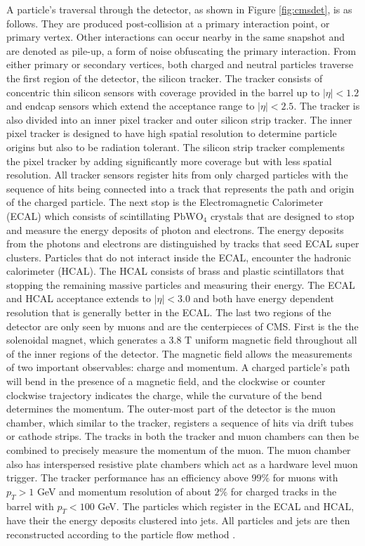 A particle's traversal through the detector, as shown in Figure \ref{fig:cmsdet}, is as follows. They are produced post-collision at a primary interaction point, or primary vertex. Other interactions can occur nearby in the same snapshot and are denoted as pile-up, a form of noise obfuscating the primary interaction. From either primary or secondary vertices, both charged and neutral particles traverse the first region of the detector, the silicon tracker. The tracker consists of concentric thin silicon sensors with coverage provided in the barrel up to $|\eta|<1.2$ and endcap sensors which extend the acceptance range to $|\eta| < 2.5$. The tracker is also divided into an inner pixel tracker and outer silicon strip tracker. The inner pixel tracker is designed to have high spatial resolution to determine particle origins but also to be radiation tolerant. The silicon strip tracker complements the pixel tracker by adding significantly more coverage but with less spatial resolution. All tracker sensors  register hits from only charged particles with the sequence of hits being connected into a track that represents the path and origin of the charged particle.  The next stop is the Electromagnetic Calorimeter (ECAL) which consists of scintillating $\text{PbWO}_4$ crystals that are designed to stop and measure the energy deposits of photon and electrons. The energy deposits from the photons and electrons are distinguished by tracks that seed ECAL super clusters. Particles that do not interact inside the ECAL, encounter the hadronic calorimeter (HCAL). The HCAL consists of brass and plastic scintillators that stopping the remaining massive particles and measuring their energy. The ECAL and HCAL acceptance extends to $|\eta| <3.0$ and both have energy dependent resolution that is generally better in the ECAL. The last two regions of the detector are only seen by muons and are the centerpieces of CMS. First is the the solenoidal magnet, which generates a 3.8 T uniform magnetic field throughout all of the inner regions of the detector. The magnetic field allows the measurements of two important observables: charge and momentum.  A charged particle's path will bend in the presence of a magnetic field, and the clockwise or counter clockwise trajectory indicates the charge, while the curvature of the bend determines the momentum. The outer-most part of the detector is the muon chamber, which similar to the tracker, registers a sequence of hits via drift tubes or cathode strips. The tracks in both the tracker and muon chambers can then be combined to precisely measure the momentum of the muon. The muon chamber also has interspersed resistive plate chambers which act as a hardware level muon trigger. The tracker performance has an efficiency above $99\%$ for muons with $p_T > 1$ GeV and momentum resolution of about $2\%$ for charged tracks in the barrel with $p_T < 100$ GeV. The particles which register in the ECAL and HCAL, have their the energy deposits clustered into jets. All particles and jets are then reconstructed according to the particle flow method \cite{CMS:2017yfk}. \cite{CMS:2008xjf} \cite{CMS:2017lum}

